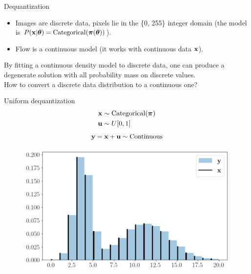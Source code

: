 \begin{frame}{Dequantization}
	\begin{itemize}
		\item Images are discrete data, pixels lie in the \{0, 255\} integer domain (the model is $P(\mathbf{x} | \boldsymbol{\theta}) = \text{Categorical}(\boldsymbol{\pi}(\boldsymbol{\theta}))$).
		\item Flow is a continuous model (it works with continuous data $\mathbf{x}$).
	\end{itemize}
	By fitting a continuous density model to discrete data, one can produce a degenerate solution with all probability mass on discrete values. \\
	How to convert a discrete data distribution to a continuous one?
	
	\begin{minipage}[t]{0.5\columnwidth}
		\begin{block}{Uniform dequantization}
		\vspace{-0.5cm}
			\begin{align*}
				\mathbf{x} &\sim \text{Categorical}(\boldsymbol{\pi}) \\
				 \mathbf{u} &\sim U[0, 1]
			\end{align*}
			\[
			\mathbf{y} = \mathbf{x} + \mathbf{u} \sim \text{Continuous} 
			\]
		\end{block}
	\end{minipage}%
	\begin{minipage}[t]{0.5\columnwidth}
		\begin{figure}
			\centering
			\includegraphics[width=1.0\linewidth]{figs/uniform_dequantization.png}
		\end{figure}
	\end{minipage}
\end{frame}
